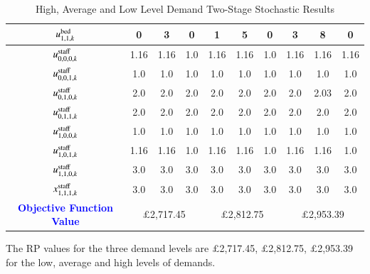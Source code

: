 \documentclass[../thesis.tex]{subfiles}
\begin{document}
{\begin{landscape}
\begin{table}[h!]
\begin{tabular}{cccccccccc}
    $u^\textnormal{bed}_{1,1,k}$     & 0  & 3  & 0  & 1  & 5  & 0  & 3  & 8  & 0  \\ \midrule
    $u^\textnormal{staff}_{0,0,0,k}$ & 1.16 & 1.16 & 1.0  & 1.16 & 1.16 & 1.0  & 1.16 & 1.16 & 1.16 \\
    $u^\textnormal{staff}_{0,0,1,k}$ & 1.0  & 1.0  & 1.0  & 1.0  & 1.0  & 1.0  & 1.0  & 1.0  & 1.0  \\
    $u^\textnormal{staff}_{0,1,0,k}$ & 2.0  & 2.0  & 2.0  & 2.0  & 2.0  & 2.0  & 2.0  & 2.03 & 2.0  \\
    $u^\textnormal{staff}_{0,1,1,k}$ & 2.0  & 2.0  & 2.0  & 2.0  & 2.0  & 2.0  & 2.0  & 2.0  & 2.0  \\
    $u^\textnormal{staff}_{1,0,0,k}$ & 1.0  & 1.0  & 1.0  & 1.0  & 1.0  & 1.0  & 1.0  & 1.0  & 1.0  \\
    $u^\textnormal{staff}_{1,0,1,k}$ & 1.16 & 1.16 & 1.0  & 1.16 & 1.16 & 1.0  & 1.16 & 1.16 & 1.0  \\
    $u^\textnormal{staff}_{1,1,0,k}$ & 3.0  & 3.0  & 3.0  & 3.0  & 3.0  & 3.0  & 3.0  & 3.0  & 3.0  \\
    $x^\textnormal{staff}_{1,1,1,k}$ & 3.0  & 3.0  & 3.0  & 3.0  & 3.0  & 3.0  & 3.0  & 3.0  & 3.0  \\ \midrule
     \textbf{\textcolor{blue}{Objective Function Value}} &\multicolumn{3}{c}{$\pounds$2,717.45} & \multicolumn{3}{c}{$\pounds$2,812.75}& \multicolumn{3}{c}{$\pounds$2,953.39 }\\\bottomrule
    \end{tabular}
    \caption{High, Average and Low Level Demand Two-Stage Stochastic Results}
    \label{tab:WEStochResults}
\end{table}

\end{landscape}

The RP values for the three demand levels are $\pounds$2,717.45, $\pounds$2,812.75, $\pounds$2,953.39 for the low, average and high levels of demands. 

}
\end{document}
